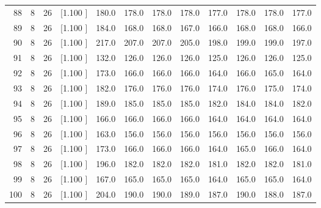 \documentclass[12pt,a4paper]{article}
\begin{document}
\begin{center}
{\begin{tabular}{r r r r r r r r r r r r}
  88&  8& 26&[1.100     ]&   180.0&   178.0&   178.0&   178.0&   177.0&   178.0&   178.0&   177.0\\[-0.02in]
  89&  8& 26&[1.100     ]&   184.0&   168.0&   168.0&   167.0&   166.0&   168.0&   168.0&   166.0\\[-0.02in]
  90&  8& 26&[1.100     ]&   217.0&   207.0&   207.0&   205.0&   198.0&   199.0&   199.0&   197.0\\[-0.02in]
  91&  8& 26&[1.100     ]&   132.0&   126.0&   126.0&   126.0&   125.0&   126.0&   126.0&   125.0\\[-0.02in]
  92&  8& 26&[1.100     ]&   173.0&   166.0&   166.0&   166.0&   164.0&   166.0&   165.0&   164.0\\[-0.02in]
  93&  8& 26&[1.100     ]&   182.0&   176.0&   176.0&   176.0&   174.0&   176.0&   175.0&   174.0\\[-0.02in]
  94&  8& 26&[1.100     ]&   189.0&   185.0&   185.0&   185.0&   182.0&   184.0&   184.0&   182.0\\[-0.02in]
  95&  8& 26&[1.100     ]&   166.0&   166.0&   166.0&   166.0&   164.0&   164.0&   164.0&   164.0\\[-0.02in]
  96&  8& 26&[1.100     ]&   163.0&   156.0&   156.0&   156.0&   156.0&   156.0&   156.0&   156.0\\[-0.02in]
  97&  8& 26&[1.100     ]&   173.0&   166.0&   166.0&   166.0&   164.0&   165.0&   166.0&   164.0\\[-0.02in]
  98&  8& 26&[1.100     ]&   196.0&   182.0&   182.0&   182.0&   181.0&   182.0&   182.0&   181.0\\[-0.02in]
  99&  8& 26&[1.100     ]&   167.0&   165.0&   165.0&   165.0&   164.0&   165.0&   165.0&   164.0\\[-0.02in]
 100&  8& 26&[1.100     ]&   204.0&   190.0&   190.0&   189.0&   187.0&   190.0&   188.0&   187.0\\[-0.02in]

\hline
\end{tabular}}
\end{center}
\end{document}
